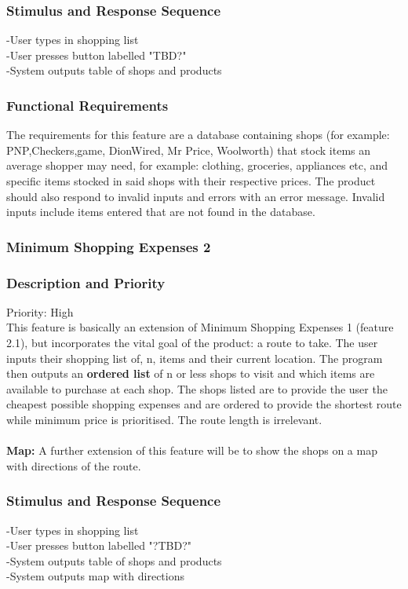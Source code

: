 \documentclass[12pt]{article}
\begin{document}
 \subsubsection*{Stimulus and Response Sequence}     
-User types in shopping list\\
-User presses button labelled "TBD?"\\
-System outputs table of shops and products\\
 \subsubsection*{Functional Requirements}
 The requirements for this feature are a database  containing shops (for example: PNP,Checkers,game, DionWired, Mr Price, Woolworth) that stock items an average shopper may need, for example: clothing, groceries, appliances etc, and specific items stocked in said shops with their respective prices. The product should also respond to invalid inputs and errors with an error message. Invalid inputs include items entered that are not found in the database.
 
 \subsubsection{Minimum Shopping Expenses 2}
\subsubsection*{Description and Priority}
 Priority: High\\
 This feature is basically an extension of Minimum Shopping Expenses 1 (feature 2.1), but incorporates the vital goal of the product: a route to take. The user inputs their shopping list of, n, items and their current location. The program then outputs an \textbf{ordered list} of n or less shops to visit and which items are available to purchase at each shop. The shops listed are to provide the user the cheapest possible shopping expenses and are ordered to provide the shortest route while minimum price is prioritised. The route length is irrelevant. 
\\\\
\textbf{Map:} A further extension of this feature will be to show the shops on a map with directions of the route.
 \subsubsection*{Stimulus and Response Sequence}
-User types in shopping list\\
-User presses button labelled "?TBD?"\\
-System outputs table of shops and products\\
-System outputs map with directions\\
\end{document}
